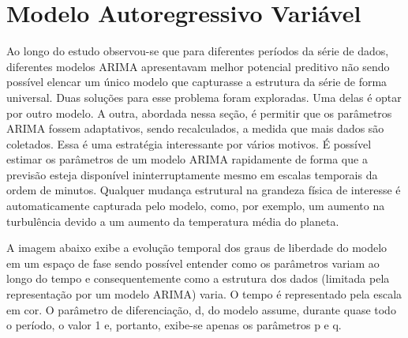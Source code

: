 \documentclass[
	12pt,				%
	openright,			%
	oneside,			%
	a4paper,			%
	english,			%
	french,				%
	spanish,			%
	brazil				%
	]{abntex2}
\begin{document}

%

\chapter{Modelo Autoregressivo Variável}

Ao longo do estudo observou-se que para diferentes períodos da série de dados, diferentes modelos ARIMA apresentavam melhor potencial preditivo não sendo possível elencar um único modelo que capturasse a estrutura da série de forma universal. Duas soluções para esse problema foram exploradas. Uma delas é optar por outro modelo. A outra, abordada nessa seção, é permitir que os parâmetros ARIMA fossem adaptativos, sendo recalculados, a medida que mais dados são coletados.
Essa é uma estratégia interessante por vários motivos. É possível estimar os parâmetros de um modelo ARIMA rapidamente de forma que a previsão esteja disponível ininterruptamente mesmo em escalas temporais da ordem de minutos. Qualquer mudança estrutural na grandeza física de interesse é automaticamente capturada pelo modelo, como, por exemplo, um aumento na turbulência devido a um aumento da temperatura média do planeta.

A imagem abaixo exibe a evolução temporal dos graus de liberdade do modelo em um espaço de fase sendo possível entender como os parâmetros variam ao longo do tempo e consequentemente como a estrutura dos dados (limitada pela representação por um modelo ARIMA) varia. O tempo é representado pela escala em cor. O parâmetro de diferenciação, d, do modelo assume, durante quase todo o período, o valor 1 e, portanto, exibe-se apenas os parâmetros p e q.
\end{document}
